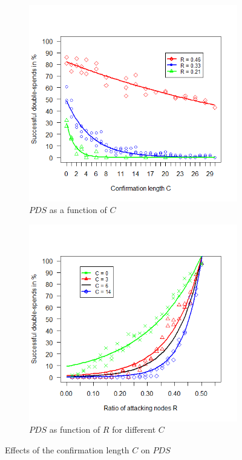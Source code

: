 \documentclass[a4paper,12pt,twoside]{report}
\begin{document}
\begin{figure}[ht!]
\centering
\begin{subfigure}{.5\textwidth}
  \centering
  \includegraphics[width=\linewidth]{Experiments/Confirmations/conf.png}
  \caption{$PDS$ as a function of $C$}
  \label{conf:a}
\end{subfigure}%
\begin{subfigure}{.5\textwidth}
  \centering
  \includegraphics[width=\linewidth]{Experiments/Confirmations/confrat.png}
  \caption{$PDS$ as function of $R$ for different $C$}
  \label{conf:b}
\end{subfigure}
\caption{Effects of the confirmation length $C$ on $PDS$}
\label{conf}
\end{figure}
\end{document}
